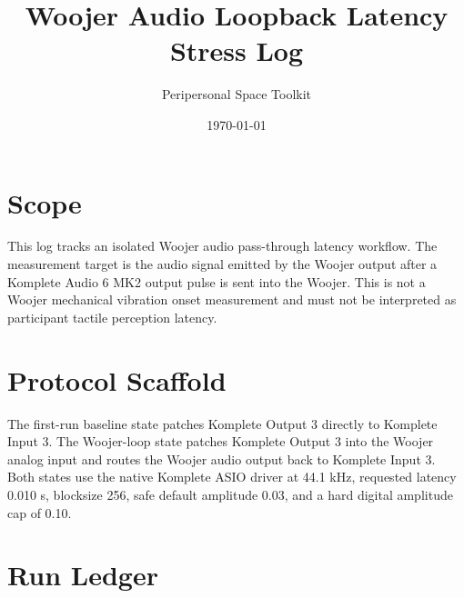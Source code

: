 \documentclass[11pt]{article}
\title{Woojer Audio Loopback Latency Stress Log}
\author{Peripersonal Space Toolkit}
\date{\today}
\begin{document}
\maketitle

\section{Scope}

This log tracks an isolated Woojer audio pass-through latency workflow. The
measurement target is the audio signal emitted by the Woojer output after a
Komplete Audio 6 MK2 output pulse is sent into the Woojer. This is not a
Woojer mechanical vibration onset measurement and must not be interpreted as
participant tactile perception latency.

\section{Protocol Scaffold}

The first-run baseline state patches Komplete Output 3 directly to Komplete
Input 3. The Woojer-loop state patches Komplete Output 3 into the Woojer analog
input and routes the Woojer audio output back to Komplete Input 3. Both states
use the native Komplete ASIO driver at 44.1 kHz, requested latency 0.010 s,
blocksize 256, safe default amplitude 0.03, and a hard digital amplitude cap of
0.10.

\section{Run Ledger}
\end{document}
